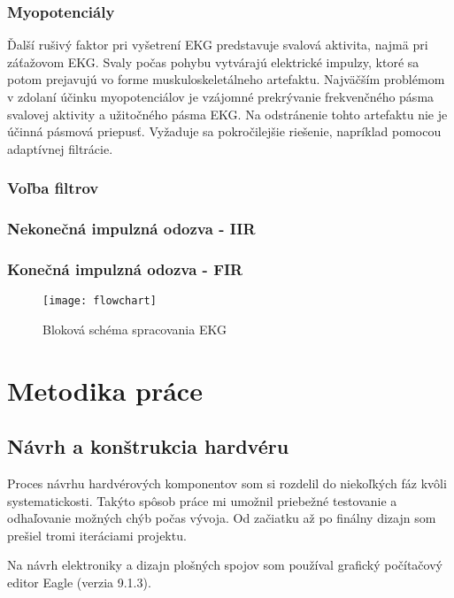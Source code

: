 \documentclass[titlepage]{article}
\begin{document}
\subsubsection{Myopotenciály}
Ďalší rušivý faktor pri vyšetrení EKG predstavuje svalová aktivita, najmä pri záťažovom EKG. Svaly počas pohybu vytvárajú elektrické impulzy, ktoré sa potom prejavujú vo forme muskuloskeletálneho artefaktu. Najväčším problémom v zdolaní účinku myopotenciálov je vzájomné prekrývanie frekvenčného pásma svalovej aktivity a užitočného pásma EKG. Na odstránenie tohto artefaktu nie je účinná pásmová priepusť. Vyžaduje sa pokročilejšie riešenie, napríklad pomocou adaptívnej filtrácie. 

\newpage
\subsubsection{Voľba filtrov}
\subsubsection*{Nekonečná impulzná odozva - IIR}
\subsubsection*{Konečná impulzná odozva - FIR}



\begin{figure}[!ht]
\begin{center}
\texttt{[image: flowchart]}
\caption{Bloková schéma spracovania EKG}
\end{center}
\end{figure}

\newpage
\section{Metodika práce}
\subsection{Návrh a konštrukcia hardvéru}
Proces návrhu hardvérových komponentov som si rozdelil do niekoľkých fáz kvôli systematickosti. Takýto spôsob práce mi umožnil priebežné testovanie a odhaľovanie možných chýb počas vývoja. Od začiatku až po finálny dizajn som prešiel tromi iteráciami projektu. 

Na návrh elektroniky a dizajn plošných spojov som používal grafický počítačový editor Eagle (verzia 9.1.3).
\end{document}
